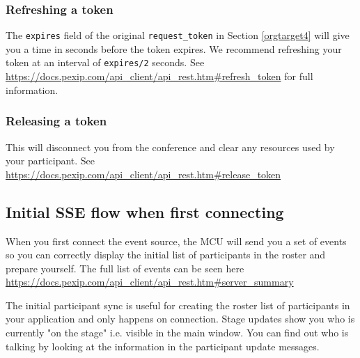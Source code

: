 \documentclass[a4paper,11pt]{article}
\begin{document}
\subsubsection{Refreshing a token}
\label{sec:orgheadline8}

The \texttt{expires} field of the original \texttt{request\_token} in Section
\ref{orgtarget4} will give you a time in seconds before the token
expires.  We recommend refreshing your token at an interval of
\texttt{expires/2} seconds.  See
\url{https://docs.pexip.com/api_client/api_rest.htm#refresh_token} for full
information.

\subsubsection{Releasing a token}
\label{sec:orgheadline9}

This will disconnect you from the conference and clear any resources
used by your participant.  See
\url{https://docs.pexip.com/api_client/api_rest.htm#release_token}

\subsection{Initial SSE flow when first connecting}
\label{sec:orgheadline11}

\label{orgtarget5}

When you first connect the event source, the MCU will send you a set
of events so you can correctly display the initial list of
participants in the roster and prepare yourself.  The full list of events
can be seen here
\url{https://docs.pexip.com/api_client/api_rest.htm#server_summary}

The initial participant sync is useful for creating the roster list of
participants in your application and only happens on connection.
Stage updates show you who is currently "on the stage" i.e. visible in
the main window.  You can find out who is talking by looking at the
information in the participant update messages.
\end{document}

